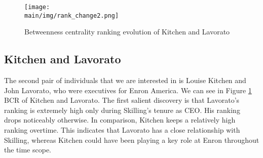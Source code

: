 \documentclass[\main/thesis.tex]{subfiles}
\begin{document}
\begin{figure}
\centering
\texttt{[image: \\main/img/rank\_change2.png]}
\caption{Betweenness centrality ranking evolution of Kitchen and Lavorato}
\label{rank_change2}
\end{figure}

\subsection*{Kitchen and Lavorato}
The second pair of individuals that we are interested in is Louise Kitchen and John Lavorato, who were executives for Enron America. We can see in Figure \ref{rank_change2} BCR of Kitchen and Lavorato. The first salient discovery is that Lavorato's ranking is extremely high only during Skilling's tenure as CEO. His ranking drops noticeably otherwise. In comparison, Kitchen keeps a relatively high ranking overtime. This indicates that Lavorato has a close relationship with Skilling, whereas Kitchen could have been playing a key role at Enron throughout the time scope.
\end{document}
